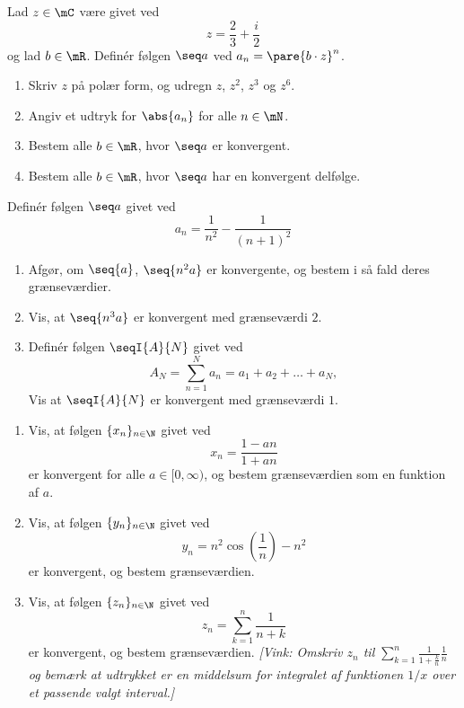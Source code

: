 \setcounter{section}{1}
\begin{opg}
Lad $z\in\mC$ være givet ved
$$ z = \frac{2}{3}+\frac{i}{2} $$
og lad $b\in\mR$. Definér følgen $\seq a$ ved $a_n = \pare{b\cdot z}^n$.
\begin{enumerate}
    \item Skriv $z$ på polær form, og udregn $z$, $z^2$, $z^3$ og $z^6$. 
    
    
    \item Angiv et udtryk for $\abs{a_n}$ for alle $n\in\mN$.

    
    
    \item Bestem alle $b\in\mR$, hvor $\seq a$ er konvergent.
    
    
    \item Bestem alle $b\in\mR$, hvor $\seq a$ har en konvergent delfølge.

\end{enumerate}
\end{opg}
\begin{opg}
Definér følgen $\seq a$ givet ved
    $$ a_n = \frac{1}{n^2} - \frac{1}{(n+1)^2} $$
\begin{enumerate}
    \item Afgør, om $\seq{a}$, $\seq{n^2a}$ er konvergente, og bestem i så fald deres grænseværdier.
    
    
    \item Vis, at $\seq{n^3a}$ er konvergent med grænseværdi $2$.
    
    
    \item Definér følgen $\seqI{A}{N}$ givet ved
    $$ A_N = \sum_{n=1}^N a_n = a_1 + a_2 + \ldots + a_N, $$
    Vis at $\seqI{A}{N}$ er konvergent med grænseværdi $1$.
\end{enumerate}
\end{opg}

\begin{opg}\hfill
	\begin{enumerate}
		\item Vis, at f\o{}lgen $\{x_n\}_{n\in\N}$ givet ved
		\[
		x_n=\frac{1-an}{1+an}
		\]	
		er konvergent for alle $a\in [0,\infty)$, og bestem gr\ae{}nsev\ae{}rdien som en funktion af $a$.
		\item Vis, at f\o{}lgen $\{y_n\}_{n\in\N}$ givet ved
		\[
		y_n=n^2\cos\left(\frac1n\right)-n^2
		\]	
		er konvergent, og bestem gr\ae{}nsev\ae{}rdien.
		\item Vis, at f\o{}lgen $\{z_n\}_{n\in\N}$ givet ved
		\[
		z_n=\sum_{k=1}^n\frac1{n+k}
		\]	
		er konvergent, og bestem gr\ae{}nsev\ae{}rdien. \textsl{[Vink: Omskriv 
			$
			z_n$ til $\sum_{k=1}^n\frac1{1+\frac kn}\frac 1n
			$
			og bem\ae{}rk at udtrykket er en middelsum for integralet af funktionen $1/x$ over et passende valgt interval.]}
	\end{enumerate}
\end{opg}
